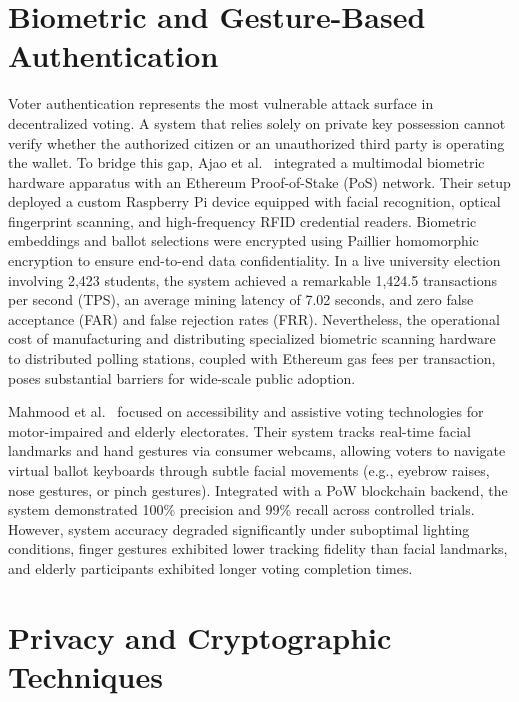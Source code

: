 \documentclass[12pt,a4paper]{report}
\begin{document}
\section{Biometric and Gesture-Based Authentication}
Voter authentication represents the most vulnerable attack surface in decentralized voting. A system that relies solely on private key possession cannot verify whether the authorized citizen or an unauthorized third party is operating the wallet. To bridge this gap, Ajao et al.~\cite{Ajao2025} integrated a multimodal biometric hardware apparatus with an Ethereum Proof-of-Stake (PoS) network. Their setup deployed a custom Raspberry Pi device equipped with facial recognition, optical fingerprint scanning, and high-frequency RFID credential readers. Biometric embeddings and ballot selections were encrypted using Paillier homomorphic encryption to ensure end-to-end data confidentiality. In a live university election involving 2,423 students, the system achieved a remarkable 1,424.5 transactions per second (TPS), an average mining latency of 7.02 seconds, and zero false acceptance (FAR) and false rejection rates (FRR). Nevertheless, the operational cost of manufacturing and distributing specialized biometric scanning hardware to distributed polling stations, coupled with Ethereum gas fees per transaction, poses substantial barriers for wide-scale public adoption.

Mahmood et al.~\cite{Mahmood2024} focused on accessibility and assistive voting technologies for motor-impaired and elderly electorates. Their system tracks real-time facial landmarks and hand gestures via consumer webcams, allowing voters to navigate virtual ballot keyboards through subtle facial movements (e.g., eyebrow raises, nose gestures, or pinch gestures). Integrated with a PoW blockchain backend, the system demonstrated 100\% precision and 99\% recall across controlled trials. However, system accuracy degraded significantly under suboptimal lighting conditions, finger gestures exhibited lower tracking fidelity than facial landmarks, and elderly participants exhibited longer voting completion times.

\section{Privacy and Cryptographic Techniques}
\end{document}
